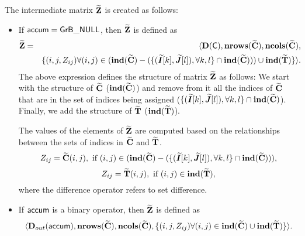 The intermediate matrix ${\bf \widetilde{Z}}$ is created as follows:
\begin{itemize}
    \item If ${\sf accum} = {\sf GrB\_NULL}$, then ${\bf \widetilde{Z}}$ is defined as 
    \begin{eqnarray}
        {\bf \widetilde{Z}} & = &
		\langle \bold{D}({\sf C}),\bold{nrows}({\bf \widetilde{C}}),
        \bold{ncols}({\bf \widetilde{C}}), \nonumber \\
    & & \{(i,j,Z_{ij})  \forall (i,j) \in
        (\bold{ind}({\bf \widetilde{C}}) - (\{
            (\bm{\widetilde{I}}[k],\bm{\widetilde{J}}[l]),
            \forall k,l\} \cap \bold{ind}({\bf \widetilde{C}}))) \cup
        \bold{ind}({\bf \widetilde{T}}) \} \rangle. \nonumber
    \end{eqnarray}
    The above expression defines the structure of matrix ${\bf \widetilde{Z}}$ as follows:
    We start with the structure of ${\bf \widetilde{C}}$ ($\bold{ind}({\bf \widetilde{C}})$) and remove from 
    it all the indices of ${\bf \widetilde{C}}$ that are
    in the set of indices being assigned ($\{(\bm{\widetilde{I}}[k],\bm{\widetilde{J}}[l]),\forall k,l\} \cap \bold{ind}({\bf \widetilde{C}})$). Finally, we
    add the structure of ${\bf \widetilde{T}}$ ($\bold{ind}({\bf \widetilde{T}})$).

    The values of the elements of ${\bf \widetilde{Z}}$ are computed based on the 
    relationships between the sets of indices in ${\bf \widetilde{C}}$ and 
    ${\bf \widetilde{T}}$.
    \[
        Z_{ij} = \matrix{\widetilde{C}}(i,j), \ \mbox{if}\  (i,j) \in  
        (\bold{ind}(\matrix{\widetilde{C}}) - (\{ (\grbarray{\widetilde{I}}[k],\grbarray{\widetilde{J}}[l]), \forall k, l\}
        \cap \bold{ind}(\matrix{\widetilde{C}}))),
    \]
    \[
        Z_{ij} = \matrix{\widetilde{T}}(i,j), \ \mbox{if}\ (i,j) \in  
        \bold{ind}(\matrix{\widetilde{T}}),
    \]
    where the difference operator refers to set difference.

    \item If ${\sf accum}$ is a binary operator, then ${\bf \widetilde{Z}}$ is defined as
        \[ \langle \mbox{$\mathbf{D}_{out}$}({\sf accum}), \bold{nrows}({\bf \widetilde{C}}), \bold{ncols}({\bf \widetilde{C}}),
        \{(i,j,Z_{ij})  \forall (i,j) \in \bold{ind}({\bf \widetilde{C}}) \cup 
        \bold{ind}({\bf \widetilde{T}}) \} \rangle.\]


\end{itemize}
